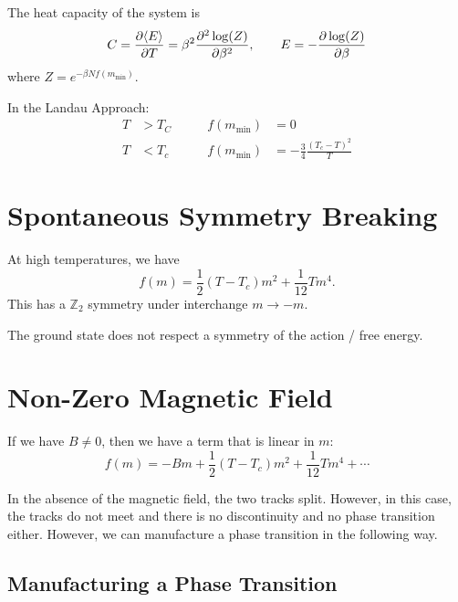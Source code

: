 \begin{definition}
  The heat capacity of the system is
\begin{equation}
  C = \pdv{\langle E \rangle}{T} = \beta^2 \pdv[2]{\log(Z)}{\beta}, \qquad E = -\pdv{\log(Z)}{\beta}
\end{equation}
  where $Z = e^{-\beta N f(m_{\text{min}})}$.
\end{definition}
In the Landau Approach:
\begin{align}
  T &> T_C \qquad & f(m_{\text{min}}) &= 0 \\
  T &< T_c & f(m_{\text{min}}) &= -\frac{3}{4} \frac{(T_c - T)^2}{T}
\end{align}


\section{Spontaneous Symmetry Breaking}%
\label{sec:spontaneous_symmetry_breaking}

At high temperatures, we have
\begin{equation}
  f(m)= \frac{1}{2}(T - T_c)m^2 + \frac{1}{12} T m^4.
\end{equation}
This has a $\mathbb{Z}_2$ symmetry under interchange $m \to -m$.

\begin{definition}
The ground state does not respect a symmetry of the action / free energy.
\end{definition}

\section{Non-Zero Magnetic Field}%
\label{sec:non_zero_magnetic_field}

If we have $B \neq 0$, then we have a term that is linear in $m$:
\begin{equation}
  f(m) = -Bm + \frac{1}{2}(T-T_c) m^2 + \frac{1}{12} T m^4 + \cdots
\end{equation}


In the absence of the magnetic field, the two tracks split. However, in this case, the tracks do not meet and there is no discontinuity and no phase transition either.
However, we can manufacture a phase transition in the following way.

\subsection{Manufacturing a Phase Transition}%
\label{sub:manufacturing_a_phase_transition}

